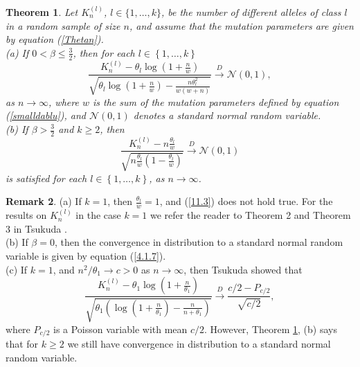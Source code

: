\documentclass[12pt]{amsart}
\newtheorem{thm}{Theorem}[section]
\theoremstyle{definition}
\newtheorem{rem}[thm]{Remark}
\numberwithin{equation}{section}
\begin{document}
\begin{thm}\label{Theorem12.8}Let $K_n^{(l)}$, $l\in\{1,\ldots,k\}$, be the number of different alleles of class $l$ in a random sample of size $n$,
and assume that the mutation parameters  are given by equation (\ref{Thetan}).\\
(a) If $0<\beta\leq\frac{3}{2}$, then for each $l\in\left\{1,\ldots,k\right\}$
\begin{equation}
\frac{K_n^{(l)}-\theta_l\log\left(1+\frac{n}{w}\right)}{\sqrt{\theta_l\log\left(1+\frac{n}{w}\right)-
\frac{n\theta_l^2}{w
\left(w+n\right)}}}
\overset{D}{\longrightarrow}\mathcal{N}\left(0,1\right),
\end{equation}
as $n\rightarrow\infty$, where $w$ is the sum of the mutation parameters defined by equation (\ref{smalldablu}), and $\mathcal{N}(0,1)$ denotes a standard normal random variable.\\
(b) If $\beta>\frac{3}{2}$ and $k\geq 2$, then
\begin{equation}\label{11.3}
\frac{K_n^{(l)}-n\frac{\theta_l}{w}}{\sqrt{n\frac{\theta_l}{w}
\left(1-\frac{\theta_l}{w}\right)}}
\overset{D}{\longrightarrow}\mathcal{N}(0,1)
\end{equation}
is satisfied for each $l\in\left\{1,\ldots,k\right\}$, as $n\rightarrow\infty$.
\end{thm}
\begin{rem}
(a) If $k=1$, then $\frac{\theta_l}{w}=1$, and
(\ref{11.3}) does not hold true. For the results on $K_n^{(l)}$ in the case $k=1$ we refer the reader
to Theorem 2 and Theorem 3 in Tsukuda \cite{Tsukuda}.\\
(b) If $\beta=0$, then the convergence in distribution
to a standard normal random variable is given by equation
(\ref{4.1.7}).\\
(c) If $k=1$, and $n^2/\theta_1\rightarrow c>0$ as $n\rightarrow\infty$, then Tsukuda \cite{Tsukuda} showed that
\begin{equation}
\frac{K_n^{(l)}-\theta_1\log\left(1+\frac{n}{\theta_1}\right)}{\sqrt{\theta_1\left(\log\left(1+\frac{n}{\theta_1}\right)-\frac{n}{n+\theta_1}\right)}}\overset{D}{\longrightarrow}
\frac{c/2-P_{c/2}}{\sqrt{c/2}},
\end{equation}
where $P_{c/2}$ is a Poisson variable with mean $c/2$. However, Theorem \ref{Theorem12.8}, (b) says that for $k\geq 2$
we still have convergence in distribution to a standard normal random variable.
\end{rem}
\end{document}
